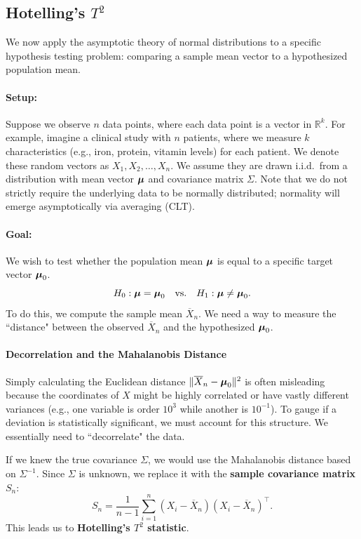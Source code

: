 \subsection{Hotelling's $T^2$}
\label{ssec:Hotellings's T2}

We now apply the asymptotic theory of normal distributions to a specific hypothesis testing problem: comparing a sample mean vector to a hypothesized population mean.

\paragraph{Setup:}
Suppose we observe $n$ data points, where each data point is a vector in $\mathbb{R}^k$.
For example, imagine a clinical study with $n$ patients, where we measure $k$ characteristics (e.g., iron, protein, vitamin levels) for each patient. We denote these random vectors as $X_1, X_2, \dots, X_n$.
We assume they are drawn i.i.d.\ from a distribution with mean vector $\boldsymbol{\mu}$ and covariance matrix $\Sigma$. Note that we do not strictly require the underlying data to be normally distributed; normality will emerge asymptotically via averaging (CLT).

\paragraph{Goal:}
We wish to test whether the population mean $\boldsymbol{\mu}$ is equal to a specific target vector $\boldsymbol{\mu}_0$.
\[
    H_0 : \boldsymbol{\mu} = \boldsymbol{\mu}_0 \quad \text{vs.} \quad H_1 : \boldsymbol{\mu} \neq \boldsymbol{\mu}_0.
\]
To do this, we compute the sample mean $\overline{X}_n$. We need a way to measure the ``distance" between the observed $\overline{X}_n$ and the hypothesized $\boldsymbol{\mu}_0$.

\paragraph{Decorrelation and the Mahalanobis Distance}
Simply calculating the Euclidean distance $\|\overline{X}_n - \boldsymbol{\mu}_0\|^2$ is often misleading because the coordinates of $X$ might be highly correlated or have vastly different variances (e.g., one variable is order $10^3$ while another is $10^{-1}$).
To gauge if a deviation is statistically significant, we must account for this structure. We essentially need to ``decorrelate" the data.



If we knew the true covariance $\Sigma$, we would use the Mahalanobis distance based on $\Sigma^{-1}$. Since $\Sigma$ is unknown, we replace it with the \textbf{sample covariance matrix} $S_n$:
\[
    S_{n} = \frac{1}{n-1}\sum_{i=1}^{n} (X_{i}-\overline{X}_{n})(X_{i}-\overline{X}_{n})^{\top}.
\]
This leads us to \textbf{Hotelling's $T^2$ statistic}.

